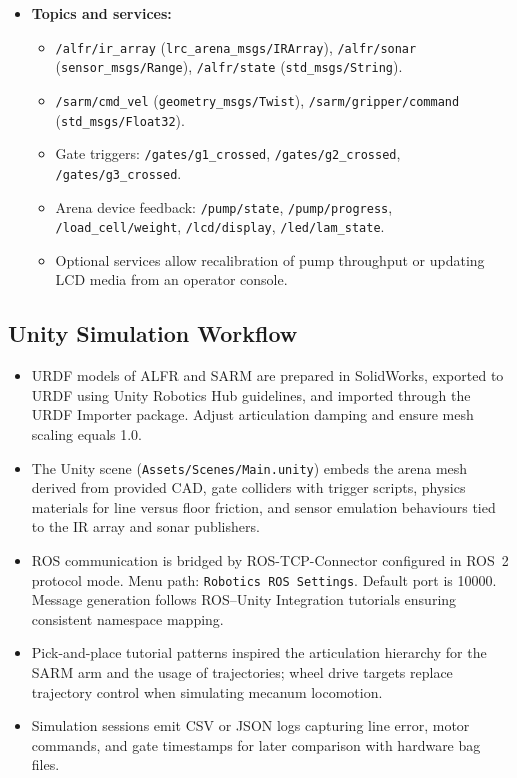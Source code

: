 \documentclass[12pt]{article}
\begin{document}
\begin{itemize}
\begin{itemize}
    \end{itemize}
    \item \textbf{Topics and services:}
    \begin{itemize}
        \item \texttt{/alfr/ir\_array} (\texttt{lrc\_arena\_msgs/IRArray}), \texttt{/alfr/sonar} (\texttt{sensor\_msgs/Range}), \texttt{/alfr/state} (\texttt{std\_msgs/String}).
        \item \texttt{/sarm/cmd\_vel} (\texttt{geometry\_msgs/Twist}), \texttt{/sarm/gripper/command} (\texttt{std\_msgs/Float32}).
        \item Gate triggers: \texttt{/gates/g1\_crossed}, \texttt{/gates/g2\_crossed}, \texttt{/gates/g3\_crossed}.
        \item Arena device feedback: \texttt{/pump/state}, \texttt{/pump/progress}, \texttt{/load\_cell/weight}, \texttt{/lcd/display}, \texttt{/led/lam\_state}.
        \item Optional services allow recalibration of pump throughput or updating LCD media from an operator console.
    \end{itemize}
\end{itemize}

\subsection{Unity Simulation Workflow}
\begin{itemize}
    \item URDF models of ALFR and SARM are prepared in SolidWorks, exported to URDF using Unity Robotics Hub guidelines, and imported through the URDF Importer package. Adjust articulation damping and ensure mesh scaling equals 1.0.
    \item The Unity scene (\texttt{Assets/Scenes/Main.unity}) embeds the arena mesh derived from provided CAD, gate colliders with trigger scripts, physics materials for line versus floor friction, and sensor emulation behaviours tied to the IR array and sonar publishers.
    \item ROS communication is bridged by ROS-TCP-Connector configured in ROS~2 protocol mode. Menu path: \texttt{Robotics \textrightarrow{} ROS Settings}. Default port is 10000. Message generation follows ROS--Unity Integration tutorials ensuring consistent namespace mapping.
    \item Pick-and-place tutorial patterns inspired the articulation hierarchy for the SARM arm and the usage of trajectories; wheel drive targets replace trajectory control when simulating mecanum locomotion.
    \item Simulation sessions emit CSV or JSON logs capturing line error, motor commands, and gate timestamps for later comparison with hardware bag files.
\end{itemize}
\end{document}
